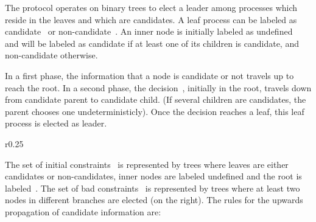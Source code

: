 
The protocol operates on binary trees to elect a leader among
processes which reside in the leaves and which are candidates.
%
A leaf process can be labeled as candidate~ or
non-candidate~.
%
An inner node is initially labeled as undefined~ and will
be labeled as candidate if at least one of its children is candidate,
and non-candidate otherwise.

In a first phase, the information that a node is candidate or not
travels up to reach the root.
%
In a second phase, the decision~, initially in the root,
travels down from candidate parent to candidate child.
%
(If several children are candidates, the parent chooses one
undeterministicly).
%
Once the decision reaches a leaf, this leaf process is elected as
leader.
%

\begin{wrapfigure}{r}{0.25\linewidth}
  \hfill%
\end{wrapfigure}
% 
The set of initial constraints \Inits\ is represented by trees where
leaves are either candidates or non-candidates, inner nodes are
labeled undefined and the root is labeled~.
%
The set of bad constraints \Bad\ is represented by trees where at
least two nodes in different branches are elected (on the right).
%
The rules for the upwards propagation of candidate information are:

{\noindent\centering%
  \par%
}

